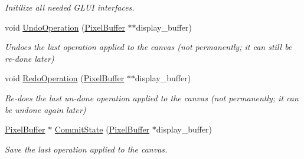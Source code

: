 \begin{DoxyCompactItemize}
\begin{DoxyCompactList}\small\item\em Initilize all needed G\+L\+UI interfaces. \end{DoxyCompactList}\item 
void \hyperlink{classimage__tools_1_1StateManager_a145acd832974e75bfcf36fde5d346262}{Undo\+Operation} (\hyperlink{classimage__tools_1_1PixelBuffer}{Pixel\+Buffer} $\ast$$\ast$display\+\_\+buffer)\hypertarget{classimage__tools_1_1StateManager_a145acd832974e75bfcf36fde5d346262}{}\label{classimage__tools_1_1StateManager_a145acd832974e75bfcf36fde5d346262}

\begin{DoxyCompactList}\small\item\em Undoes the last operation applied to the canvas (not permanently; it can still be re-\/done later) \end{DoxyCompactList}\item 
void \hyperlink{classimage__tools_1_1StateManager_a7567b735bfaf0cf9075bf85358d23510}{Redo\+Operation} (\hyperlink{classimage__tools_1_1PixelBuffer}{Pixel\+Buffer} $\ast$$\ast$display\+\_\+buffer)\hypertarget{classimage__tools_1_1StateManager_a7567b735bfaf0cf9075bf85358d23510}{}\label{classimage__tools_1_1StateManager_a7567b735bfaf0cf9075bf85358d23510}

\begin{DoxyCompactList}\small\item\em Re-\/does the last un-\/done operation applied to the canvas (not permanently; it can be undone again later) \end{DoxyCompactList}\item 
\hyperlink{classimage__tools_1_1PixelBuffer}{Pixel\+Buffer} $\ast$ \hyperlink{classimage__tools_1_1StateManager_a739110673567bdae3826d597192443eb}{Commit\+State} (\hyperlink{classimage__tools_1_1PixelBuffer}{Pixel\+Buffer} $\ast$display\+\_\+buffer)\hypertarget{classimage__tools_1_1StateManager_a739110673567bdae3826d597192443eb}{}\label{classimage__tools_1_1StateManager_a739110673567bdae3826d597192443eb}

\begin{DoxyCompactList}\small\item\em Save the last operation applied to the canvas. \end{DoxyCompactList}\end{DoxyCompactItemize}
